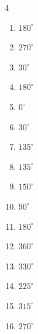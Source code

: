 \begin{multicols}{4}
\begin{enumerate}
  \item $\displaystyle 180^{\circ}$
        \phantom{$\displaystyle =\pi$}

  \item $\displaystyle 270^{\circ}$

  \item $\displaystyle 30^{\circ}$

  \item $\displaystyle 180^{\circ}$
        \phantom{$\displaystyle =\pi$}

  \item $\displaystyle 0^{\circ}$
        \phantom{$\displaystyle =0$}

  \item $\displaystyle 30^{\circ}$

  \item $\displaystyle 135^{\circ}$

\columnbreak %

  \item $\displaystyle 135^{\circ}$

  \item $\displaystyle 150^{\circ}$

  \item $\displaystyle 90^{\circ}$

  \item $\displaystyle 180^{\circ}$
        \phantom{$\displaystyle =\pi$}

  \item $\displaystyle 360^{\circ}$
        \phantom{$\displaystyle =2\pi$}

  \item $\displaystyle 330^{\circ}$

  \item $\displaystyle 225^{\circ}$

  \item $\displaystyle 315^{\circ}$

  \item $\displaystyle 270^{\circ}$


\end{enumerate}
\end{multicols}
